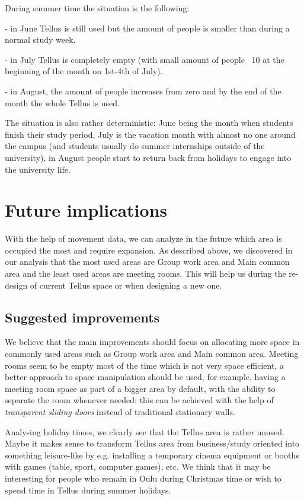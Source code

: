 \documentclass{article}
\begin{document}
During summer time the situation is the following:

- in June Tellus is still used but the amount of people is smaller than during a normal study week.

- in July Tellus is completely empty (with small amount of people ~10 at the beginning of the month
on 1st-4th of July).

- in August, the amount of people increases from zero and by the end of the month the whole Tellus
is used.

The situation is also rather deterministic: June being the month when students finish their study
period, July is the vacation month with almost no one around the campus (and students usually do
summer internships outside of the university), in August people start to return back from holidays
to engage into the university life.

\section{Future implications}

With the help of movement data, we can analyze in the future which area is occupied the most and
require expansion. As described above, we discovered in our analysis that the most used areas are
Group work area and Main common area and the least used areas are meeting rooms. This will help us
during the re-design of current Tellus space or when designing a new one.

\subsection{Suggested improvements}

We believe that the main improvements should focus on allocating more space in commonly used
areas such as Group work area and Main common area. Meeting rooms seem to be empty most of the time
which is not very space efficient, a better approach to space manipulation should be used, for
example, having a meeting room space as part of a bigger area by default, with the ability to
separate the room whenever needed: this can be achieved with the help of \textit{transparent sliding
doors} instead of traditional stationary walls.

Analysing holiday times, we clearly see that the Tellus area is rather unused. Maybe it makes sense
to transform Tellus area from business/study oriented into something leisure-like by e.g. installing
a temporary cinema equipment or booths with games (table, sport, computer games), etc. We think that
it may be interesting for people who remain in Oulu during Christmas time or wish to spend time in
Tellus during summer holidays.
\end{document}
